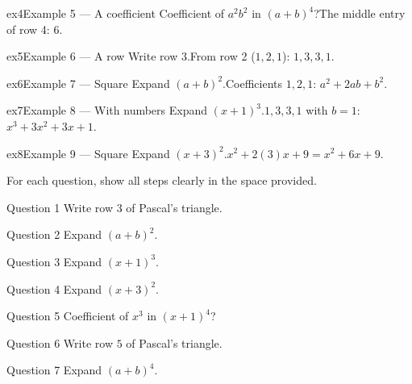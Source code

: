 \documentclass[11pt]{article}
\begin{document}
\begin{example}{ex4}{Example 5 --- A coefficient}
Coefficient of $a^2b^2$ in $(a+b)^4$?\soln The middle entry of row 4: $6$.
\end{example}

\begin{example}{ex5}{Example 6 --- A row}
Write row $3$.\soln From row 2 ($1,2,1$): $1,3,3,1$.
\end{example}

\begin{example}{ex6}{Example 7 --- Square}
Expand $(a+b)^2$.\soln Coefficients $1,2,1$: $a^2+2ab+b^2$.
\end{example}

\begin{example}{ex7}{Example 8 --- With numbers}
Expand $(x+1)^3$.\soln $1,3,3,1$ with $b=1$: $x^3+3x^2+3x+1$.
\end{example}

\begin{example}{ex8}{Example 9 --- Square}
Expand $(x+3)^2$.\soln $x^2+2(3)x+9=x^2+6x+9$.
\end{example}

\clearpage
{}
For each question, show all steps clearly in the space provided.

\begin{qbox}{Question 1}
Write row $3$ of Pascal's triangle.\workspace{2.4cm}
\end{qbox}

\begin{qbox}{Question 2}
Expand $(a+b)^2$.\workspace{2.4cm}
\end{qbox}

\begin{qbox}{Question 3}
Expand $(x+1)^3$.\workspace{2.4cm}
\end{qbox}

\begin{qbox}{Question 4}
Expand $(x+3)^2$.\workspace{2.4cm}
\end{qbox}

\begin{qbox}{Question 5}
Coefficient of $x^3$ in $(x+1)^4$?\workspace{2.4cm}
\end{qbox}

\begin{qbox}{Question 6}
Write row $5$ of Pascal's triangle.\workspace{2.4cm}
\end{qbox}

\begin{qbox}{Question 7}
Expand $(a+b)^4$.\workspace{2.4cm}
\end{qbox}
\end{document}
